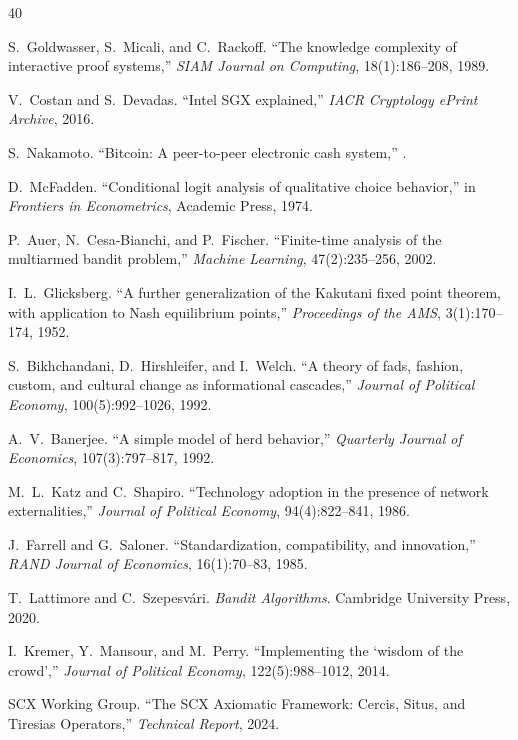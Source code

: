 \documentclass[12pt,a4paper]{article}
\begin{document}

\begin{thebibliography}{40}

S.~Goldwasser, S.~Micali, and C.~Rackoff.
\newblock ``The knowledge complexity of interactive proof systems,''
\newblock \emph{SIAM Journal on Computing}, 18(1):186--208, 1989.

V.~Costan and S.~Devadas.
\newblock ``Intel SGX explained,''
\newblock \emph{IACR Cryptology ePrint Archive}, 2016.

S.~Nakamoto.
\newblock ``Bitcoin: A peer-to-peer electronic cash system,''
.

D.~McFadden.
\newblock ``Conditional logit analysis of qualitative choice behavior,''
\newblock in \emph{Frontiers in Econometrics}, Academic Press, 1974.

P.~Auer, N.~Cesa-Bianchi, and P.~Fischer.
\newblock ``Finite-time analysis of the multiarmed bandit problem,''
\newblock \emph{Machine Learning}, 47(2):235--256, 2002.

I.~L.~Glicksberg.
\newblock ``A further generalization of the Kakutani fixed point theorem,
with application to Nash equilibrium points,''
\newblock \emph{Proceedings of the AMS}, 3(1):170--174, 1952.

S.~Bikhchandani, D.~Hirshleifer, and I.~Welch.
\newblock ``A theory of fads, fashion, custom, and cultural change as
informational cascades,''
\newblock \emph{Journal of Political Economy}, 100(5):992--1026, 1992.

A.~V.~Banerjee.
\newblock ``A simple model of herd behavior,''
\newblock \emph{Quarterly Journal of Economics}, 107(3):797--817, 1992.

M.~L.~Katz and C.~Shapiro.
\newblock ``Technology adoption in the presence of network externalities,''
\newblock \emph{Journal of Political Economy}, 94(4):822--841, 1986.

J.~Farrell and G.~Saloner.
\newblock ``Standardization, compatibility, and innovation,''
\newblock \emph{RAND Journal of Economics}, 16(1):70--83, 1985.

T.~Lattimore and C.~Szepesv\'ari.
\newblock \emph{Bandit Algorithms}.
\newblock Cambridge University Press, 2020.

I.~Kremer, Y.~Mansour, and M.~Perry.
\newblock ``Implementing the `wisdom of the crowd',''
\newblock \emph{Journal of Political Economy}, 122(5):988--1012, 2014.

SCX Working Group.
\newblock ``The SCX Axiomatic Framework: Cercis, Situs, and Tiresias
Operators,''
\newblock \emph{Technical Report}, 2024.

\end{thebibliography}
\end{document}
